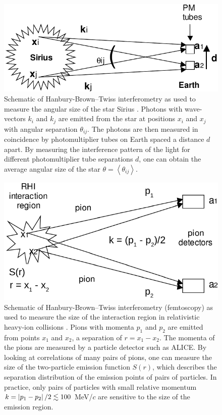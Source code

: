 \begin{figure}[hbt]
\includegraphics[width=36pc]{Figures/BorrowedFigures/SiriusHBT.pdf}
\caption[Schematic of Hanbury-Brown--Twiss interferometry in astronomy]{Schematic of Hanbury-Brown--Twiss interferometry as used to measure the angular size of the star Sirius \cite{Humanic:2005ye}.
Photons with wave-vectors $k_i$ and $k_j$ are emitted from the star at positions $x_i$ and $x_j$ with angular separation $\theta_{ij}$. The photons are then measured in coincidence by photomultiplier tubes on Earth spaced a distance $d$ apart.
By measuring the interference pattern of the light for different photomultiplier tube separations $d$, one can obtain the average angular size of the star $\theta = \left\langle \theta_{ij} \right\rangle$.
}
\label{fig:SiriusHBT}
\end{figure}
\begin{figure}[hbt]
\includegraphics[width=36pc]{Figures/BorrowedFigures/HeavyIonHBT.pdf}
\caption[Schematic of Hanbury-Brown--Twiss interferometry (femtoscopy) in heavy-ion collisions]{Schematic of Hanbury-Brown--Twiss interferometry (femtoscopy) as used to measure the size of the interaction region in relativistic heavy-ion collisions \cite{Humanic:2005ye}.
Pions with momenta $p_1$ and $p_2$ are emitted from points $x_1$ and $x_2$, a separation of $r = x_1 - x_2$. 
The momenta of the pions are measured by a particle detector such as ALICE.
By looking at correlations of many pairs of pions, one can measure the size of the two-particle emission function $S(r)$, which describes the separation distribution of the emission points of pairs of particles.
In practice, only pairs of particles with small relative momentum $k = \left\lvert p_1 - p_2\right\rvert/2 \lesssim 100$ MeV/$c$ are sensitive to the size of the emission region.
}
\label{fig:HeavyIonHBT}
\end{figure}

